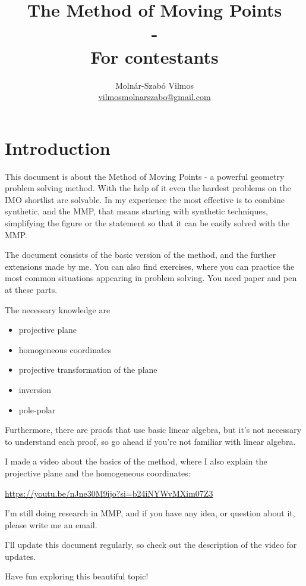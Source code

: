 \documentclass[a4paper]{article}
\title{\vspace*{10mm}\bf The Method of Moving Points\\
-\\
For contestants} %
\author{Molnár-Szabó Vilmos\\ \href{mailto:vilmosmolnarszabo@gmail.com}{vilmosmolnarszabo@gmail.com}} %
\date{} %
\begin{document}
\maketitle

\tableofcontents

\section{Introduction}

This document is about the Method of Moving Points - a powerful geometry problem solving method. With the help of it even the hardest problems on the IMO shortlist are solvable. In my experience the most effective is to combine synthetic, and the MMP, that means starting with synthetic techniques, simplifying the figure or the statement so that it can be easily solved with the MMP.

The document consists of the basic version of the method\cite{animation}\cite{mmp}, and the further extensions made by me. You can also find exercises, where you can practice the most common situations appearing in problem solving. You need paper and pen at these parts.

The necessary knowledge are
\begin{itemize}
    \item projective plane
    \item homogeneous coordinates
    \item projective transformation of the plane
    \item inversion
    \item pole-polar
\end{itemize}

Furthermore, there are proofs that use basic linear algebra, but it's not necessary to understand each proof, so go ahead if you're not familiar with linear algebra.

I made a video about the basics of the method, where I also explain the projective plane and the homogeneous coordinates:

\url{https://youtu.be/nJne30M9ijo?si=b24iNYWvMXim07Z3}

I'm still doing research in MMP, and if you have any idea, or question about it, please write me an email.

I'll update this document regularly, so check out the description of the video for updates.

Have fun exploring this beautiful topic!
\end{document}
